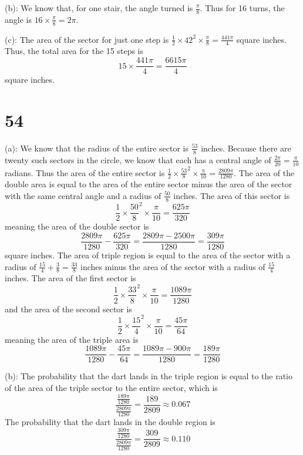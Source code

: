 \documentclass{article}
\theoremstyle{definition}
\newcommand{\?}{\stackrel{?}{=}}
\begin{document}
(b): We know that, for one stair, the angle turned is $\frac{\pi}{8}$. Thus for 16 turns, the angle is $16\times\frac{\pi}{8}=2\pi$.


(c): The area of the sector for just one step is $\frac{1}{2}\times 42^2\times\frac{\pi}{8}=\frac{441\pi}{4}$ square inches. Thus, the total area for the 15 steps is
\[ 15\times\frac{441\pi}{4}=\frac{6615\pi}{4} \] square inches.

\section*{54}
(a): We know that the radius of the entire sector is $\frac{53}{8}$ inches. Because there are twenty such sectors in the circle, we know that each has a central angle of 
$\frac{2\pi}{20}=\frac{\pi}{10}$ radians. Thus the area of the entire sector is $\frac{1}{2}\times\frac{53}{8}^2\times\frac{\pi}{10}=\frac{2809\pi}{1280}$. The area of the double area is 
equal to the area of the entire sector minus the area of the sector with the same central angle and a radius of $\frac{50}{8}$ inches. The area of this sector is
\[ \frac{1}{2}\times\frac{50}{8}^2\times\frac{\pi}{10}=\frac{625\pi}{320} \] meaning the area of the double sector is
\[ \frac{2809\pi}{1280}-\frac{625\pi}{320}=\frac{2809\pi-2500\pi}{1280}=\frac{309\pi}{1280} \] square inches. The area of triple region is equal to the area of the sector with a radius of 
$\frac{15}{4}+\frac{3}{8}=\frac{33}{8}$ inches minus the area of the sector with a radius of $\frac{15}{4}$ inches. The area of the first sector is
\[ \frac{1}{2}\times\frac{33}{8}^2\times\frac{\pi}{10}=\frac{1089\pi}{1280} \] and the area of the second sector is
\[ \frac{1}{2}\times\frac{15}{4}^2\times\frac{\pi}{10}=\frac{45\pi}{64} \] meaning the area of the triple area is
\[ \frac{1089\pi}{1280}-\frac{45\pi}{64}=\frac{1089\pi-900\pi}{1280}=\frac{189\pi}{1280} \] 


(b): The probability that the dart lands in the triple region is equal to the ratio of the area of the triple sector to the entire sector, which is
\[ \dfrac{\frac{189\pi}{1280}}{\frac{2809\pi}{1280}}=\frac{189}{2809}\approx 0.067 \]
The probability that the dart lands in the double region is
\[ \dfrac{\frac{309\pi}{1280}}{\frac{2809\pi}{1280}}=\frac{309}{2809}\approx 0.110 \]
\end{document}
